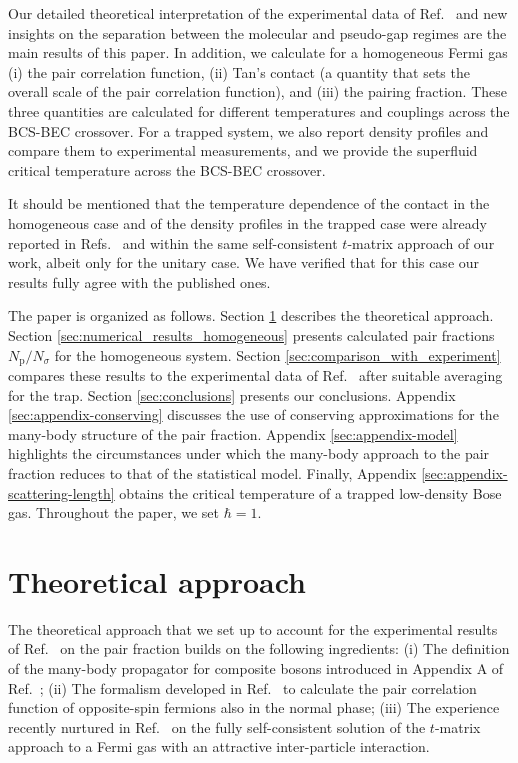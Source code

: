 \documentclass[pra,twocolumn,aps,amssymb,showpacs,superscriptaddress]{revtex4-1}
\begin{document}
Our detailed theoretical interpretation of the experimental data of Ref.~\cite{Ulm-Cam-2019} and new insights on the separation between the molecular and pseudo-gap regimes are 
the main results of this paper. 
In addition, we calculate for a homogeneous Fermi gas (i) the pair correlation function, (ii) Tan's contact (a quantity that sets the overall scale of the pair correlation function), and (iii) the pairing fraction. These three quantities are calculated for different temperatures and couplings across the BCS-BEC crossover. 
For a trapped system, we also report density profiles and compare them to experimental measurements, and we provide the superfluid critical temperature across the BCS-BEC crossover.

It should be mentioned that the temperature dependence of the contact in the homogeneous case and of the density profiles in the trapped case were already reported in Refs.~\cite{Enss-2011} and \cite{Haussmann-2008} within the same self-consistent $t$-matrix approach of our work, albeit only for the unitary case.  
We have verified that for this case our results fully agree with the published ones. 

The paper is organized as follows.
Section \ref{sec:theoretical_approach} describes the theoretical approach. 
Section \ref{sec:numerical_results_homogeneous} presents calculated pair fractions $N_{\mathrm{p}}/N_{\sigma}$ for the homogeneous system.
Section \ref{sec:comparison_with_experiment} compares these results to the experimental data of Ref.~\cite{Ulm-Cam-2019} after suitable averaging for the trap.
Section \ref{sec:conclusions} presents our conclusions.
Appendix \ref{sec:appendix-conserving} discusses the use of conserving approximations for the many-body structure of the pair fraction.
Appendix \ref{sec:appendix-model} highlights the circumstances under which the many-body approach to the pair fraction reduces to that of the statistical model.
Finally, Appendix \ref{sec:appendix-scattering-length} obtains the critical temperature of a trapped low-density Bose gas.
Throughout the paper, we set $\hbar =1$.

\section{Theoretical approach} 
\label{sec:theoretical_approach}

The theoretical approach that we set up to account for the experimental results of Ref.~\cite{Ulm-Cam-2019} on the pair fraction builds on the following ingredients:
(i) The definition of the many-body propagator for composite bosons introduced in Appendix A of Ref.~\cite{Andrenacci-2003};
(ii) The formalism developed in Ref.~\cite{Palestini-2014} to calculate the pair correlation function of opposite-spin fermions also in the normal phase;
(iii) The experience recently nurtured in Ref.~\cite{PPS-2019} on the fully self-consistent solution of the $t$-matrix approach to a Fermi gas with an attractive inter-particle interaction.
\end{document}
